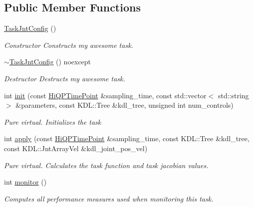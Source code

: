 \subsection*{Public Member Functions}
\begin{DoxyCompactItemize}
\item 
\hypertarget{classhiqp_1_1TaskJntConfig_a29b4fbc6207f5de40f3e880274f6f716}{\hyperlink{classhiqp_1_1TaskJntConfig_a29b4fbc6207f5de40f3e880274f6f716}{Task\-Jnt\-Config} ()}\label{classhiqp_1_1TaskJntConfig_a29b4fbc6207f5de40f3e880274f6f716}

\begin{DoxyCompactList}\small\item\em Constructor Constructs my awesome task. \end{DoxyCompactList}\item 
\hypertarget{classhiqp_1_1TaskJntConfig_aae049672adb68630748475005fe49ff4}{\hyperlink{classhiqp_1_1TaskJntConfig_aae049672adb68630748475005fe49ff4}{$\sim$\-Task\-Jnt\-Config} () noexcept}\label{classhiqp_1_1TaskJntConfig_aae049672adb68630748475005fe49ff4}

\begin{DoxyCompactList}\small\item\em Destructor Destructs my awesome task. \end{DoxyCompactList}\item 
int \hyperlink{classhiqp_1_1TaskJntConfig_a03d9d877da64b956d7afd91e536c7fcd}{init} (const \hyperlink{classhiqp_1_1HiQPTimePoint}{Hi\-Q\-P\-Time\-Point} \&sampling\-\_\-time, const std\-::vector$<$ std\-::string $>$ \&parameters, const K\-D\-L\-::\-Tree \&kdl\-\_\-tree, unsigned int num\-\_\-controls)
\begin{DoxyCompactList}\small\item\em {\itshape Pure virtual}. Initializes the task \end{DoxyCompactList}\item 
int \hyperlink{classhiqp_1_1TaskJntConfig_a34dd3b5a79953fa6c0f970dcdd66873b}{apply} (const \hyperlink{classhiqp_1_1HiQPTimePoint}{Hi\-Q\-P\-Time\-Point} \&sampling\-\_\-time, const K\-D\-L\-::\-Tree \&kdl\-\_\-tree, const K\-D\-L\-::\-Jnt\-Array\-Vel \&kdl\-\_\-joint\-\_\-pos\-\_\-vel)
\begin{DoxyCompactList}\small\item\em {\itshape Pure virtual}. Calculates the task function and task jacobian values. \end{DoxyCompactList}\item 
int \hyperlink{classhiqp_1_1TaskJntConfig_af4d673c3b78a3c461abce090c0871a63}{monitor} ()
\begin{DoxyCompactList}\small\item\em Computes all performance measures used when monitoring this task. \end{DoxyCompactList}\end{DoxyCompactItemize}
